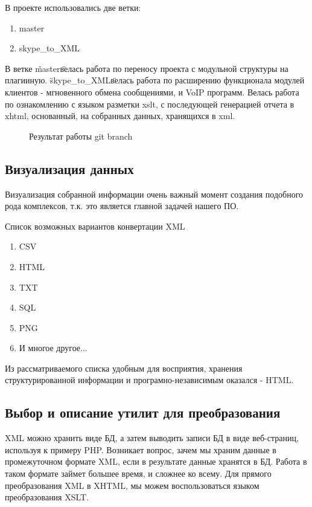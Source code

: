 В проекте использовались две ветки:

\begin{enumerate}
\item master
\item skype\_to\_XML
\end{enumerate}

 В ветке \"master\" велась работа по переносу проекта с модульной структуры на плагииную. \"skype\_to\_XML\" велась работа по расширению функционала модулей клиентов - мгновенного обмена сообщениями, и VoIP программ. Велась работа по ознакомлению с языком разметки xslt, с последующей генерацией отчета в xhtml, основанный, на собранных данных, хранящихся в xml.

\begin{figure}[h]
\caption{Результат работы git branch}
\label{pic:branch_project}
\end{figure}

\subsection{Визуализация данных}
Визуализация собранной информации очень важный момент создания подобного рода комплексов, т.к. это является главной задачей нашего ПО. 

Список возможных вариантов конвертации XML
\begin{enumerate}
\item CSV
\item HTML
\item TXT
\item SQL

\item PNG
\item И многое другое...
\end{enumerate}

Из рассматриваемого списка удобным для восприятия, хранения структурированной информации и 
програмно-независимым%
оказался - HTML.

\subsection{Выбор и описание утилит для преобразования}

XML можно хранить виде БД, а затем выводить записи БД в виде веб-страниц, используя к примеру PHP. Возникает вопрос, зачем мы храним данные в промежуточном формате XML, если в результате данные хранятся в БД. Работа в таком формате займет большее время, и сложнее ко всему. Для прямого преобразования XML в XHTML, мы можем воспользоваться языком преобразования XSLT. 

